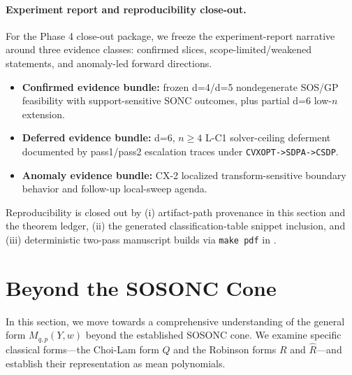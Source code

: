 \documentclass{article}
\begin{document}
\paragraph{Experiment report and reproducibility close-out.}
For the Phase 4 close-out package, we freeze the experiment-report narrative around three
evidence classes: confirmed slices, scope-limited/weakened statements, and anomaly-led
forward directions.
\begin{itemize}
    \item \textbf{Confirmed evidence bundle:}
    frozen d=4/d=5 nondegenerate SOS/GP feasibility with support-sensitive SONC outcomes,
    plus partial d=6 low-$n$ extension.
    \item \textbf{Deferred evidence bundle:}
    d=6, $n\geq 4$ L-C1 solver-ceiling deferment documented by pass1/pass2 escalation traces
    under \texttt{CVXOPT->SDPA->CSDP}.
    \item \textbf{Anomaly evidence bundle:}
    CX-2 localized transform-sensitive boundary behavior and follow-up local-sweep agenda.
\end{itemize}

Reproducibility is closed out by (i) artifact-path provenance in this section and
the theorem ledger, (ii) the generated classification-table snippet inclusion,
and (iii) deterministic two-pass manuscript builds via \texttt{make pdf} in
.

\section{Beyond the SOSONC Cone}
\label{s05}

In this section, we move towards a comprehensive understanding of the general form $M_{q,p}(Y,w)$ beyond the established 
SOSONC cone. We examine specific classical forms—the Choi-Lam form $Q$ and the Robinson forms $R$ and $\hat{R}$—and 
establish their representation as mean polynomials.
\end{document}
